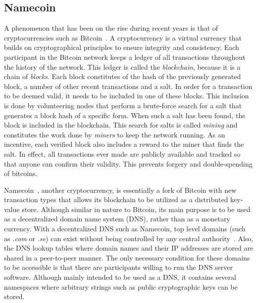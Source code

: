 \subsection{Namecoin}
A phenomenon that has been on the rise during recent years is that of cryptocurrencies such as Bitcoin~\cite{nakamoto:2009}. A cryptocurrency is a virtual currency that builds on cryptographical principles to ensure integrity and consistency. Each participant in the Bitcoin network keeps a ledger of all transactions throughout the history of the network. This ledger is called the \emph{blockchain}, because it is a chain of \emph{blocks}. Each block constitutes of the hash of the previously generated block, a number of other recent transactions and a salt. In order for a transaction to be deemed valid, it needs to be included in one of these blocks. This inclusion is done by volunteering nodes that perform a brute-force search for a salt that generates a block hash of a specific form. When such a salt has been found, the block is included in the blockchain. This search for salts is called \emph{mining} and constitutes the work done by \emph{miners} to keep the network running. As an incentive, each verified block also includes a reward to the miner that finds the salt. In effect, all transactions ever made are publicly available and tracked so that anyone can confirm their validity. This prevents forgery and double-spending of bitcoins.

Namecoin~\cite{Namecoin:Online}, another cryptocurrency, is essentially a fork of Bitcoin with new transaction types that allows its blockchain to be utilized as a distributed key-value store. Although similar in nature to Bitcoin, its main purpose is to be used as a decentralized domain name system (DNS), rather than as a monetary currency. With a decentralized DNS such as Namecoin, top level domains (such as \emph{.com} or \emph{.se}) can exist without being controlled by any central authority~\cite{Coindesk:2013:Online}. Also, the DNS lookup tables where domain names and their IP addresses are stored are shared in a peer-to-peer manner. The only necessary condition for these domains to be accessible is that there are participants willing to run the DNS server software. Although mainly intended to be used as a DNS, it contains several namespaces where arbitrary strings such as public cryptographic keys can be stored.

